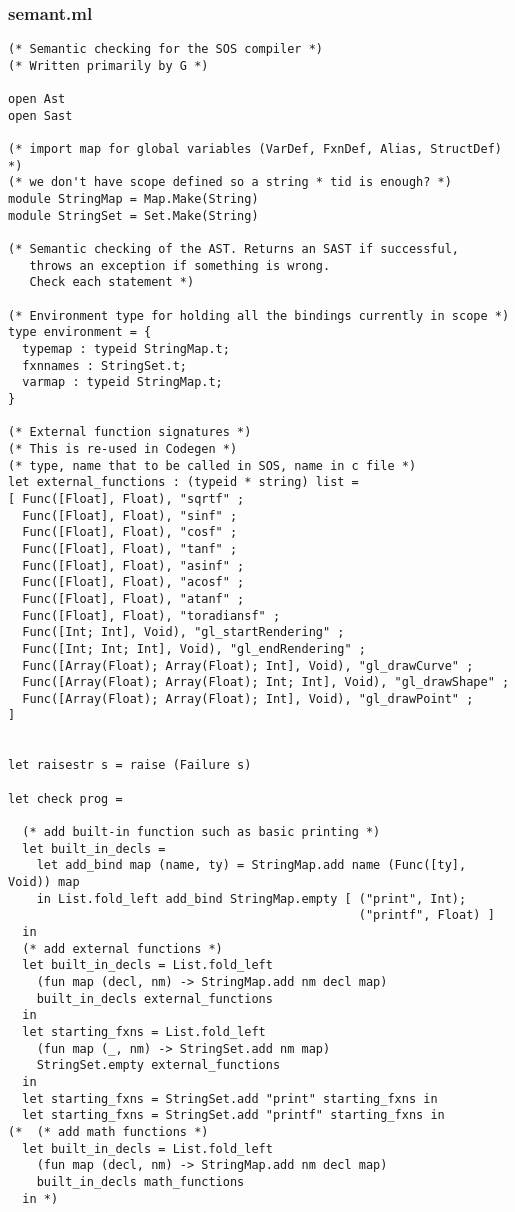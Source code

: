 \documentclass[main.tex]{subfiles}
\begin{document}
\subsubsection{semant.ml}
\begin{lstlisting}
(* Semantic checking for the SOS compiler *)
(* Written primarily by G *)

open Ast
open Sast

(* import map for global variables (VarDef, FxnDef, Alias, StructDef) *)
(* we don't have scope defined so a string * tid is enough? *)
module StringMap = Map.Make(String)
module StringSet = Set.Make(String)

(* Semantic checking of the AST. Returns an SAST if successful,
   throws an exception if something is wrong.
   Check each statement *)

(* Environment type for holding all the bindings currently in scope *)
type environment = {
  typemap : typeid StringMap.t;
  fxnnames : StringSet.t;
  varmap : typeid StringMap.t;
}

(* External function signatures *)
(* This is re-used in Codegen *)
(* type, name that to be called in SOS, name in c file *)
let external_functions : (typeid * string) list =
[ Func([Float], Float), "sqrtf" ;
  Func([Float], Float), "sinf" ;
  Func([Float], Float), "cosf" ;
  Func([Float], Float), "tanf" ;
  Func([Float], Float), "asinf" ;
  Func([Float], Float), "acosf" ;
  Func([Float], Float), "atanf" ;
  Func([Float], Float), "toradiansf" ;
  Func([Int; Int], Void), "gl_startRendering" ;
  Func([Int; Int; Int], Void), "gl_endRendering" ;
  Func([Array(Float); Array(Float); Int], Void), "gl_drawCurve" ;
  Func([Array(Float); Array(Float); Int; Int], Void), "gl_drawShape" ;
  Func([Array(Float); Array(Float); Int], Void), "gl_drawPoint" ;
]


let raisestr s = raise (Failure s) 

let check prog =

  (* add built-in function such as basic printing *)
  let built_in_decls =
    let add_bind map (name, ty) = StringMap.add name (Func([ty], Void)) map 
    in List.fold_left add_bind StringMap.empty [ ("print", Int);
                                                 ("printf", Float) ]
  in
  (* add external functions *)
  let built_in_decls = List.fold_left
    (fun map (decl, nm) -> StringMap.add nm decl map)
    built_in_decls external_functions
  in
  let starting_fxns = List.fold_left
    (fun map (_, nm) -> StringSet.add nm map)
    StringSet.empty external_functions
  in
  let starting_fxns = StringSet.add "print" starting_fxns in
  let starting_fxns = StringSet.add "printf" starting_fxns in
(*  (* add math functions *)
  let built_in_decls = List.fold_left
    (fun map (decl, nm) -> StringMap.add nm decl map)
    built_in_decls math_functions
  in *)


\end{lstlisting}
\end{document}
